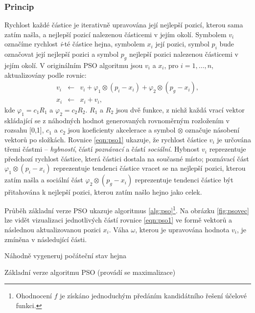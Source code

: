 \documentclass[a4paper,12pt]{article}
\begin{document}
\subsubsection{Princip}
Rychlost každé částice je iterativně upravována její nejlepší pozicí, kterou sama zatím našla, a nejlepší
pozicí nalezenou částicemi v jejím okolí. Symbolem $v_i$ označíme rychlost {\it i}-té částice hejna, symbolem
$x_i$ její pozici, symbol $p_i$ bude označovat její nejlepší pozici a symbol $p_g$ nejlepší pozici nalezenou
částicemi v jejím okolí. V originálním PSO algoritmu jsou $v_i$ a $x_i$, pro $i=1,\dots,n$, aktualizovány
podle rovnic:
\begin{eqnarray}
v_i & \leftarrow & v_i+\varphi_1\otimes(p_i-x_i)+\varphi_2\otimes(p_g-x_i), \label{eqn:pso1} \\
x_i & \leftarrow & x_i + v_i, \label{eqn:pso2}
\end{eqnarray}
kde $\varphi_1=c_1R_1$ a $\varphi_2=c_2R_2$. $R_1$ a $R_2$ jsou dvě funkce, z nichž každá vrací vektor skládající
se z náhodných hodnot generovaných rovnoměrným rozložením v rozsahu [0,1], $c_1$ a $c_2$ jsou koeficienty
akcelerace a symbol $\otimes$ označuje násobení vektorů po složkách. Rovnice \ref{eqn:pso1} ukazuje, že rychlost
částice $v_i$ je určována třemi částmi -- {\it hybností}, částí {\it poznávací} a částí {\it sociální}. Hybnost $v_i$
reprezentuje předchozí rychlost částice, která částici dostala na současné místo; poznávací část
$\varphi_1\otimes(p_i-x_i)$ reprezentuje tendenci částice vracet se na nejlepší pozici, kterou zatím našla a
sociální část $\varphi_2\otimes(p_g-x_i)$ reprezentuje tendenci částice být přitahována k nejlepší pozici, kterou zatím našlo hejno jako celek.

Průběh základní verze PSO ukazuje algoritmus \ref{alg:pso}\footnote{Ohodnocení $f$ je získáno jednoduchým předáním
kandidátního řešení účelové funkci.}.
Na obrázku \ref{fig:psovec} lze vidět vizualizaci jednotlivých částí rovnice \ref{eqn:pso1} ve formě
vektorů a následnou aktualizovanou pozici $x_i$. Váha $\omega$, kterou je upravována hodnota $v_i$, je
zmíněna v následující části.

\begin{algorithm}[here]
  \DontPrintSemicolon
  \SetAlgoNoLine
  Náhodně vygeneruj počáteční stav hejna\;
\caption{Základní verze algoritmu PSO (provádí se maximalizace)\label{alg:pso}}
\end{algorithm}
\end{document}
